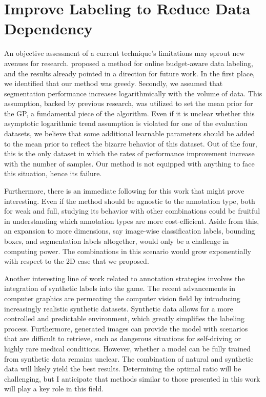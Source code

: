 
\section{Improve Labeling to Reduce Data Dependency}
An objective assessment of a current technique's limitations may sprout new avenues for research.  proposed a method for online budget-aware data labeling, and the results already pointed in a direction for future work. In the first place, we identified that our method was greedy. Secondly, we assumed that segmentation performance increases logarithmically with the volume of data. This assumption, backed by previous research, was utilized to set the mean prior for the GP, a fundamental piece of the algorithm. Even if it is unclear whether this asymptotic logarithmic trend assumption is violated for one of the evaluation datasets, we believe that some additional learnable parameters should be added to the mean prior to reflect the bizarre behavior of this dataset. Out of the four, this is the only dataset in which the rates of performance improvement increase with the number of samples. Our method is not equipped with anything to face this situation, hence its failure.

Furthermore, there is an immediate following for this work that might prove interesting. Even if the method should be agnostic to the annotation type, both for weak and full, studying its behavior with other combinations could be fruitful in understanding which annotation types are more cost-efficient. Aside from this, an expansion to more dimensions, say image-wise classification labels, bounding boxes, and segmentation labels altogether, would only be a challenge in computing power. The combinations in this scenario would grow exponentially with respect to the 2D case that we proposed.

Another interesting line of work related to annotation strategies involves the integration of synthetic labels into the game. The recent advancements in computer graphics are permeating the computer vision field by introducing increasingly realistic synthetic datasets. Synthetic data allows for a more controlled and predictable environment, which greatly simplifies the labeling process. Furthermore, generated images can provide the model with scenarios that are difficult to retrieve, such as dangerous situations for self-driving or highly rare medical conditions. However, whether a model can be fully trained from synthetic data remains unclear. The combination of natural and synthetic data will likely yield the best results. Determining the optimal ratio will be challenging, but I anticipate that methods similar to those presented in this work will play a key role in this field. 

